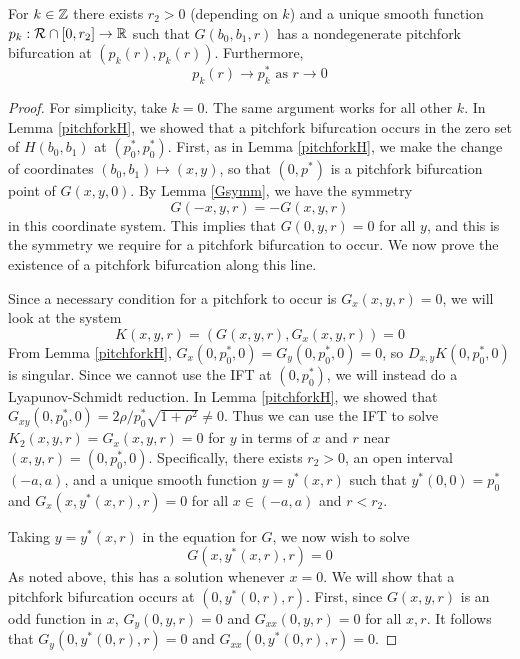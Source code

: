 \documentclass[thesis.tex]{subfiles}
\begin{document}
\begin{lemma}\label{pitchpersist}
For $k \in {\mathbb Z}$ there exists $r_2 > 0$ (depending on $k$) and a unique smooth function $p_k: \mathcal{R} \cap [0, r_2] \rightarrow {\mathbb R}$ such that $G(b_0, b_1, r)$ has a nondegenerate pitchfork bifurcation at $(p_k(r),p_k(r))$. Furthermore, 
\begin{equation*}
p_k(r) \rightarrow p_k^* \text{ as } r \rightarrow 0
\end{equation*}
\begin{proof}
For simplicity, take $k = 0$. The same argument works for all other $k$. In Lemma \ref{pitchforkH}, we showed that a pitchfork bifurcation occurs in the zero set of $H(b_0, b_1)$ at $(p_0^*, p_0^*)$. First, as in Lemma \ref{pitchforkH}, we make the change of coordinates $(b_0, b_1) \mapsto (x, y)$, so that $(0, p^*)$ is a pitchfork bifurcation point of $G(x, y, 0)$. By Lemma \ref{Gsymm}, we have the symmetry 
\[
G(-x, y, r) = -G(x, y, r)
\]
in this coordinate system. This implies that $G(0, y, r) = 0$ for all $y$, and this is the symmetry we require for a pitchfork bifurcation to occur. We now prove the existence of a pitchfork bifurcation along this line. 

Since a necessary condition for a pitchfork to occur is $G_x(x, y, r) = 0$, we will look at the system
\begin{equation}
K(x,y,r) = (G(x,y,r), G_x(x,y,r)) = 0
\end{equation}
From Lemma \ref{pitchforkH}, $G_x(0,p_0^*,0) = G_y(0, p_0^*, 0) = 0$, so $D_{x,y}K(0,p_0^*,0)$ is singular. Since we cannot use the IFT at $(0, p_0^*)$, we will instead do a Lyapunov-Schmidt reduction. In Lemma \ref{pitchforkH}, we showed that $G_{xy}(0, p_0^*, 0) = 2 \rho/p_0^* \sqrt{1 + \rho^2} \neq 0$. Thus we can use the IFT to solve $K_2(x,y,r) = G_x(x,y,r) = 0$ for $y$ in terms of $x$ and $r$ near $(x,y,r) = (0, p_0^*, 0)$. Specifically, there exists $r_2 > 0$, an open interval $(-a, a)$, and a unique smooth function $y = y^*(x, r)$ such that $y^*(0, 0) = p_0^*$ and $G_x(x, y^*(x, r), r) = 0$ for all $x \in (-a, a)$ and $r < r_2$.

Taking $y = y^*(x, r)$ in the equation for $G$, we now wish to solve
\begin{equation}
G(x, y^*(x, r), r) = 0
\end{equation}
As noted above, this has a solution whenever $x = 0$. We will show that a pitchfork bifurcation occurs at $(0, y^*(0, r), r)$. First, since $G(x, y, r)$ is an odd function in $x$, $G_y(0, y, r) = 0$ and $G_{xx}(0, y, r) = 0$ for all $x, r$. It follows that $G_y(0, y^*(0, r), r) = 0$ and $G_{xx}(0, y^*(0, r), r) = 0$.


\end{proof}
\end{lemma}
\end{document}
